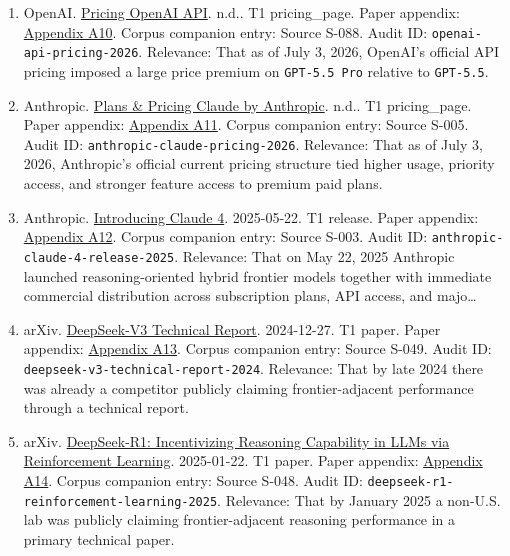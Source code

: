 \documentclass[
  american,
  11pt,
  letterpaper,
]{article}
\begin{document}
\begin{enumerate}
  \texttt{chatgpt-pricing-2026}. Relevance: That as of capture on July
  3, 2026, OpenAI's official ChatGPT plan structure reserved the
  highest-end reasoning access for upper paid tiers rather than offering
  it uniformly acr\ldots{}
\item
  OpenAI. \href{https://developers.openai.com/api/docs/pricing}{Pricing
  \textbar{} OpenAI API}. n.d.. T1 pricing\_page. Paper appendix:
  \hyperref[ch-06-appendix-a10-pricing-openai-api]{Appendix A10}. Corpus
  companion entry: Source S-088. Audit ID:
  \texttt{openai-api-pricing-2026}. Relevance: That as of July 3, 2026,
  OpenAI's official API pricing imposed a large price premium on
  \texttt{GPT-5.5\ Pro} relative to \texttt{GPT-5.5}.
\item
  Anthropic. \href{https://claude.com/pricing}{Plans \& Pricing
  \textbar{} Claude by Anthropic}. n.d.. T1 pricing\_page. Paper
  appendix:
  \hyperref[ch-06-appendix-a11-plans-pricing-claude-by-anthropic]{Appendix
  A11}. Corpus companion entry: Source S-005. Audit ID:
  \texttt{anthropic-claude-pricing-2026}. Relevance: That as of July 3,
  2026, Anthropic's official current pricing structure tied higher
  usage, priority access, and stronger feature access to premium paid
  plans.
\item
  Anthropic. \href{https://www.anthropic.com/news/claude-4}{Introducing
  Claude 4}. 2025-05-22. T1 release. Paper appendix:
  \hyperref[ch-06-appendix-a12-introducing-claude-4]{Appendix A12}.
  Corpus companion entry: Source S-003. Audit ID:
  \texttt{anthropic-claude-4-release-2025}. Relevance: That on May 22,
  2025 Anthropic launched reasoning-oriented hybrid frontier models
  together with immediate commercial distribution across subscription
  plans, API access, and majo\ldots{}
\item
  arXiv. \href{https://arxiv.org/abs/2412.19437}{DeepSeek-V3 Technical
  Report}. 2024-12-27. T1 paper. Paper appendix:
  \hyperref[ch-06-appendix-a13-deepseek-v3-technical-report]{Appendix
  A13}. Corpus companion entry: Source S-049. Audit ID:
  \texttt{deepseek-v3-technical-report-2024}. Relevance: That by late
  2024 there was already a competitor publicly claiming
  frontier-adjacent performance through a technical report.
\item
  arXiv. \href{https://arxiv.org/abs/2501.12948}{DeepSeek-R1:
  Incentivizing Reasoning Capability in LLMs via Reinforcement
  Learning}. 2025-01-22. T1 paper. Paper appendix:
  \hyperref[ch-06-appendix-a14-deepseek-r1-incentivizing-reasoning-capability-in-llms-via-reinforcement-learning]{Appendix
  A14}. Corpus companion entry: Source S-048. Audit ID:
  \texttt{deepseek-r1-reinforcement-learning-2025}. Relevance: That by
  January 2025 a non-U.S. lab was publicly claiming frontier-adjacent
  reasoning performance in a primary technical paper.
\end{enumerate}
\end{document}

